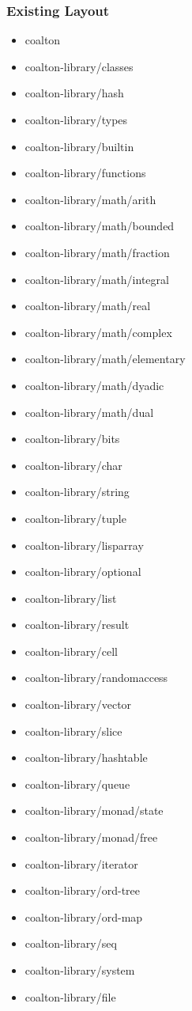 \documentclass[12pt]{article}
\begin{document}
\subsubsection{Existing Layout}

\begin{itemize}
\item coalton
\item coalton-library/classes
\item coalton-library/hash
\item coalton-library/types
\item coalton-library/builtin
\item coalton-library/functions
\item coalton-library/math/arith
\item coalton-library/math/bounded
\item coalton-library/math/fraction
\item coalton-library/math/integral
\item coalton-library/math/real
\item coalton-library/math/complex
\item coalton-library/math/elementary
\item coalton-library/math/dyadic
\item coalton-library/math/dual
\item coalton-library/bits
\item coalton-library/char
\item coalton-library/string
\item coalton-library/tuple
\item coalton-library/lisparray
\item coalton-library/optional
\item coalton-library/list
\item coalton-library/result
\item coalton-library/cell
\item coalton-library/randomaccess
\item coalton-library/vector
\item coalton-library/slice
\item coalton-library/hashtable
\item coalton-library/queue
\item coalton-library/monad/state
\item coalton-library/monad/free
\item coalton-library/iterator
\item coalton-library/ord-tree
\item coalton-library/ord-map
\item coalton-library/seq
\item coalton-library/system
\item coalton-library/file
\end {itemize}
\end{document}
